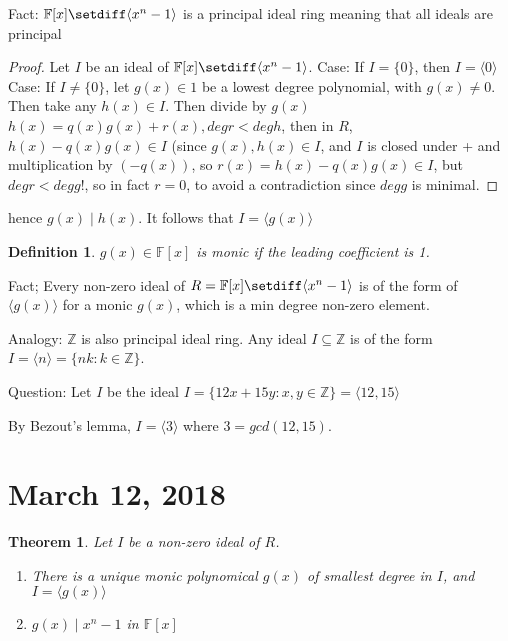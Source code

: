 \documentclass{article}
\newtheorem{thm}{Theorem}
\newtheorem{defn}{Definition}
\begin{document}
Fact: $\mathbb{F}[x]\setdiff\langle x^n -1\rangle$ is a principal ideal ring
meaning that all ideals are principal

\begin{proof}
    Let $I$ be an ideal of $\mathbb{F}[x]\setdiff \langle x^n-1\rangle$.
    Case: If $I = \{0\}$, then $I = \langle 0\rangle$
    Case: If $I\ne \{0\}$, let $g(x)\in 1$ be a lowest degree polynomial,
    with $g(x) \ne 0$. Then take any $h(x)\in I$. Then divide by $g(x)$
    $h(x) = q(x)g(x) + r(x), deg r < deg h$, then in $R$, $h(x)-q(x)g(x)\in I$
    (since $g(x), h(x) \in I$, and $I$ is closed under + and multiplication
    by $(-q(x))$, so $r(x) = h(x) - q(x)g(x) \in I$, but $deg r < deg g$!, so
    in fact $r = 0$, to avoid a contradiction since $deg g$ is minimal.
\end{proof}

hence $g(x)\mid h(x)$. It follows that $I = \langle g(x) \rangle$

\begin{defn}
    $g(x)\in\mathbb{F}[x]$ is monic if the leading coefficient is 1.
\end{defn}

Fact; Every non-zero ideal of $R = \mathbb{F}[x]\setdiff \langle x^n-1\rangle$
is of the form of $\langle g(x)\rangle$ for a monic $g(x)$, which is a min
degree non-zero element.

Analogy: $\mathbb{Z}$ is also principal ideal ring. Any ideal $I \subseteq\mathbb{Z}$
is of the form $I = \langle n \rangle = \{nk: k\in\mathbb{Z}\}$.

Question: Let $I$ be the ideal $I = \{12x + 15y: x,y\in\mathbb{Z}\} = \langle 12, 15\rangle$

By Bezout's lemma, $I = \langle 3 \rangle$ where $3 = gcd(12, 15)$.

\section{March 12, 2018}
\begin{thm}
    Let $I$ be a non-zero ideal of $R$.
    \begin{enumerate}
        \item There is a unique monic polynomical $g(x)$ of smallest degree in $I$, and
            $I = \langle g(x) \rangle$
        \item $g(x)\mid x^n -1$ in $\mathbb{F}[x]$
    \end{enumerate}
\end{thm}
\end{document}
